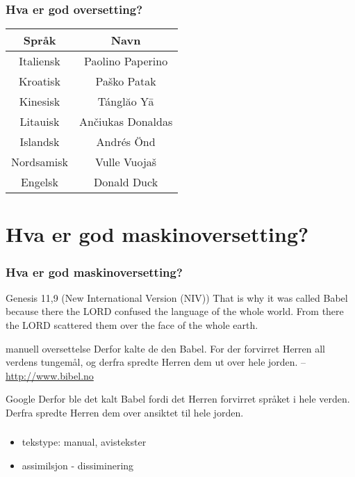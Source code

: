 \documentclass{beamer}
\begin{document}
\begin{frame}
\frametitle{Hva er god oversetting?}
\begin{tabular}{|c|c|}
\hline
\textbf{Språk} & \textbf{Navn} \\
\hline
Italiensk &  Paolino Paperino  \\
\hline
Kroatisk &  Paško Patak  \\
\hline
Kinesisk & Tánglăo Yā \\
\hline
Litauisk & Ančiukas Donaldas \\
\hline
Islandsk & Andrés Önd \\
\hline
Nordsamisk & Vulle Vuojaš \\
\hline
Engelsk & Donald Duck \\
\hline
\end{tabular}
\end{frame}

\section{Hva er god maskinoversetting?}
%
\begin{frame}\frametitle{Hva er god maskinoversetting?}
%
\begin{exampleblock}{Genesis 11,9 (New International Version (NIV))}
That is why it was called Babel because there the LORD confused the language of the whole world. From 
there the LORD scattered them over the face of the whole earth.
\end{exampleblock}

\begin{exampleblock}{manuell oversettelse}
Derfor kalte de den Babel. For der forvirret Herren all verdens tungemål, og derfra spredte Herren dem ut over hele jorden.
-- \url{http://www.bibel.no}
\end{exampleblock}

\begin{exampleblock}{Google}
Derfor ble det kalt Babel fordi det Herren forvirret språket i hele verden. Derfra spredte Herren dem over ansiktet til hele jorden.
\end{exampleblock}
\end{frame}
 
\begin{frame}
\frametitle{}
\begin{itemize}
\item tekstype: manual, avistekster
\item assimilsjon - dissiminering
\end{itemize} 
\end{frame}
\end{document}
